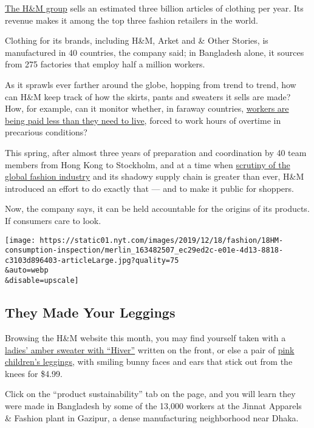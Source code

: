 \href{https://www.nytimes.com/2018/03/27/business/hm-clothes-stock-sales.html}{The
H\&M group} sells an estimated three billion articles of clothing per
year. Its revenue makes it among the top three fashion retailers in the
world.

Clothing for its brands, including H\&M, Arket and \& Other Stories, is
manufactured in 40 countries, the company said; in Bangladesh alone, it
sources from 275 factories that employ half a million workers.

As it sprawls ever farther around the globe, hopping from trend to
trend, how can H\&M keep track of how the skirts, pants and sweaters it
sells are made? How, for example, can it monitor whether, in faraway
countries,
\href{https://www.nytimes.com/2019/09/03/books/review/how-fast-fashion-is-destroying-the-planet.html}{workers
are being paid less than they need to live}, forced to work hours of
overtime in precarious conditions?

This spring, after almost three years of preparation and coordination by
40 team members from Hong Kong to Stockholm, and at a time when
\href{https://www.nytimes.com/interactive/2019/climate/sustainable-clothing.html}{scrutiny
of the global fashion industry} and its shadowy supply chain is greater
than ever, H\&M introduced an effort to do exactly that --- and to make
it public for shoppers.

Now, the company says, it can be held accountable for the origins of its
products. If consumers care to look.

\texttt{[image: https://static01.nyt.com/images/2019/12/18/fashion/18HM-consumption-inspection/merlin\_163482507\_ec29ed2c-e01e-4d13-8818-c3103d896403-articleLarge.jpg?quality=75\\\&auto=webp\\\&disable=upscale]}

\hypertarget{they-made-your-leggings}{%
\subsection{They Made Your Leggings}\label{they-made-your-leggings}}

Browsing the H\&M website this month, you may find yourself taken with a
\href{https://www2.hm.com/en_gb/search-results.html?q=0796179002}{ladies'
amber sweater with ``Hiver''} written on the front, or else a pair of
\href{https://www2.hm.com/en_gb/productpage.0808051001.html\#modalSuppliers}{pink
children's leggings}, with smiling bunny faces and ears that stick out
from the knees for \$4.99.

Click on the ``product sustainability'' tab on the page, and you will
learn they were made in Bangladesh by some of the 13,000 workers at the
Jinnat Apparels \& Fashion plant in Gazipur, a dense manufacturing
neighborhood near Dhaka.

